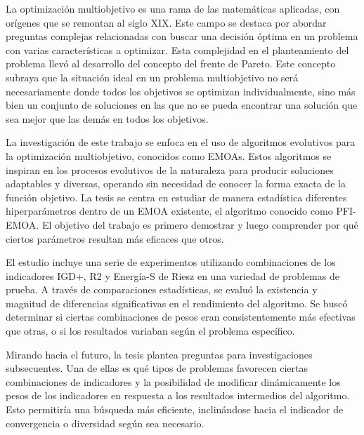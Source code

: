 


\begin{abstracts}        %


La optimización multiobjetivo es una rama de las matemáticas aplicadas, con orígenes que se remontan al siglo XIX. Este campo se destaca por abordar preguntas complejas relacionadas con buscar una decisión óptima en un problema con varias características a optimizar. Esta complejidad en el planteamiento del problema llevó al desarrollo del concepto del frente de Pareto. Este concepto subraya que la situación ideal en un problema multiobjetivo no será necesariamente donde todos los  objetivos se optimizan individualmente, sino más bien un conjunto de soluciones en las que no se pueda encontrar una solución que sea mejor que las demás en todos los objetivos.

La investigación de este trabajo se enfoca en el uso de algoritmos evolutivos para la optimización multiobjetivo, conocidos como EMOAs. Estos algoritmos se inspiran en los procesos evolutivos de la naturaleza para producir soluciones adaptables y diversas, operando sin necesidad de conocer la forma exacta de la función objetivo. La tesis se centra en estudiar de manera estadística diferentes hiperparámetros dentro de un EMOA existente, el algoritmo conocido como PFI-EMOA. El objetivo del trabajo es primero demostrar y luego comprender por qué ciertos parámetros resultan más eficaces que otros.

El estudio incluye una serie de experimentos utilizando combinaciones de los indicadores IGD+, R2 y Energía-S de Riesz en una variedad de problemas de prueba. A través de comparaciones estadísticas, se evaluó la existencia y magnitud de diferencias significativas en el rendimiento del algoritmo. Se buscó determinar si ciertas combinaciones de pesos eran consistentemente más efectivas que otras, o si los resultados variaban según el problema específico.

Mirando hacia el futuro, la tesis plantea preguntas para investigaciones subsecuentes. Una de ellas es qué tipos de problemas favorecen ciertas combinaciones de indicadores y la posibilidad de modificar dinámicamente los pesos de los indicadores en respuesta a los resultados intermedios del algoritmo. Esto permitiría una búsqueda más eficiente, inclinándose hacia el indicador de convergencia o diversidad según sea necesario.

\end{abstracts}


